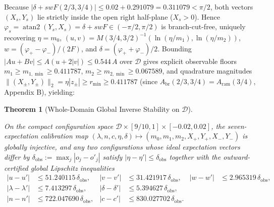 \documentclass[11pt,letterpaper]{article}
\newtheorem{theorem}{Theorem}
\theoremstyle{definition}
\begin{document}
Because
\(|\delta + swF(2/3, 3/4)| \le 0.02 + 0.291079 = 0.311079 < \pi/2\),
both vectors \((X_s, Y_s)\) lie strictly inside the open right
half-plane (\(X_s > 0\)). Hence
\(\varphi_s = \operatorname{atan2}(Y_s, X_s) = \delta + swF \in (-\pi/2, \pi/2)\)
is branch-cut-free, uniquely recovering \(\eta = m_0\),
\((u, v) = M(3/4, 3/2)^{-1}(\ln(\eta/m_1), \ln(\eta/m_2))\),
\(w = (\varphi_+ - \varphi_-)/(2F)\), and
\(\delta = (\varphi_+ + \varphi_-)/2\). Bounding
\(|A u + B v| \le A(u + 2|v|) \le 0.544\,A\) over \(\mathcal{D}\) gives
explicit observable floors \(m_1 \ge m_{1,\min} \ge 0.411787\),
\(m_2 \ge m_{2,\min} \ge 0.067589\), and quadrature magnitudes
\(\|(X_\pm, Y_\pm)\|_2 = \eta|z_\pm| \ge r_{\min} \ge 0.411787\) (since
\(A_{\mathrm{br}}(2/3,3/4) = A_{\mathrm{ram}}(3/4)\), Appendix B),
yielding:

\begin{theorem}[Whole-Domain Global Inverse Stability on $\mathcal{D}$]\label{thm-lipschitz}

On the compact configuration space
\(\mathcal{D} \times [9/10, 1] \times [-0.02, 0.02]\), the
seven-expectation calibration map
\((\lambda, n, c, \eta, \delta) \mapsto (m_0, m_1, m_2, X_+, Y_+, X_-, Y_-)\)
is globally injective, and any two configurations whose ideal
expectation vectors differ by
\(\delta_{\mathrm{obs}} := \max_j |o_j - o'_j|\) satisfy
\(|\eta - \eta'| \le \delta_{\mathrm{obs}}\) together with the
outward-certified global Lipschitz inequalities \[\begin{aligned}
|u - u'| &\le 51.240115\,\delta_{\mathrm{obs}}, & |v - v'| &\le 31.421917\,\delta_{\mathrm{obs}}, & |w - w'| &\le 2.965319\,\delta_{\mathrm{obs}}, \\
|\lambda - \lambda'| &\le 7.413297\,\delta_{\mathrm{obs}}, & |\delta - \delta'| &\le 5.394627\,\delta_{\mathrm{obs}}, & & \\
|n - n'| &\le 722.047690\,\delta_{\mathrm{obs}}, & |c - c'| &\le 830.027702\,\delta_{\mathrm{obs}}. & &
\end{aligned}
\tag{16}\]

\end{theorem}
\end{document}
